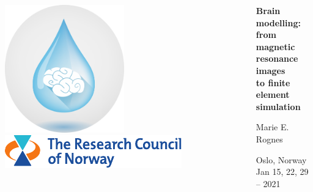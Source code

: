 \documentclass[mathserif, aspectratio=169]{beamer}
\begin{document}
\begin{frame}
\begin{columns}
\begin{column}{0.25\textwidth}
    \vspace{1em}
    \includegraphics[width=0.5\textwidth]{graphics/waterscape_logo.png} \\
    \vspace{1em}
    \includegraphics[width=\textwidth]{graphics/rcn-logo.pdf} \\
    \end{column}
    \begin{column}{0.75\textwidth}
    {
    \centering

      \vspace{4em}

      {\bf Brain modelling: \\ from magnetic resonance images \\ to finite element simulation} \\

      \bigskip
      \bigskip
      

      Marie E. Rognes \\
      \bigskip
      \bigskip

      Oslo, Norway \\
      \medskip
      Jan 15, 22, 29 -- 2021 \\
      }
    \end{column}
  \end{columns}
\end{frame}

\cleanpage
\end{document}
